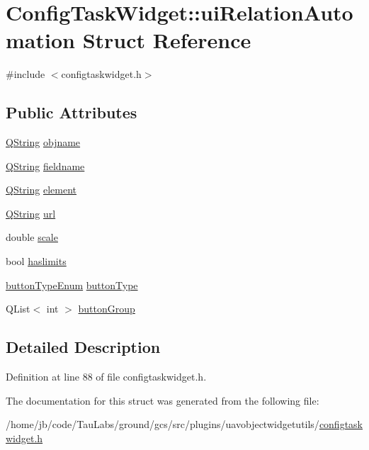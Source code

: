 \hypertarget{struct_config_task_widget_1_1ui_relation_automation}{\section{\-Config\-Task\-Widget\-:\-:ui\-Relation\-Automation \-Struct \-Reference}
\label{struct_config_task_widget_1_1ui_relation_automation}
}


{\ttfamily \#include $<$configtaskwidget.\-h$>$}

\subsection*{\-Public \-Attributes}
\begin{DoxyCompactItemize}
\item 
\hyperlink{group___u_a_v_objects_plugin_gab9d252f49c333c94a72f97ce3105a32d}{\-Q\-String} \hyperlink{group___u_a_v_object_widget_utils_ga3a6899c9cfb56d74f0bf98300a156bc7}{objname}
\item 
\hyperlink{group___u_a_v_objects_plugin_gab9d252f49c333c94a72f97ce3105a32d}{\-Q\-String} \hyperlink{group___u_a_v_object_widget_utils_ga727a26d7cef842f8e7cd274117a1153d}{fieldname}
\item 
\hyperlink{group___u_a_v_objects_plugin_gab9d252f49c333c94a72f97ce3105a32d}{\-Q\-String} \hyperlink{group___u_a_v_object_widget_utils_gabe7df1fc4c590dc11cc6f80698fc125c}{element}
\item 
\hyperlink{group___u_a_v_objects_plugin_gab9d252f49c333c94a72f97ce3105a32d}{\-Q\-String} \hyperlink{group___u_a_v_object_widget_utils_ga14b83b3a1113a21d03ee1b3e8967b7e7}{url}
\item 
double \hyperlink{group___u_a_v_object_widget_utils_gafddb00770c074c3ce12d1699813a4d30}{scale}
\item 
bool \hyperlink{group___u_a_v_object_widget_utils_ga73f9beb614502506b14c6b5d235b9d44}{haslimits}
\item 
\hyperlink{group___u_a_v_object_widget_utils_gacf8aa6ed9da799d1973519df03d1ecfa}{button\-Type\-Enum} \hyperlink{group___u_a_v_object_widget_utils_gac8fcf738efe2855fbf1c7a810a20cffd}{button\-Type}
\item 
\-Q\-List$<$ int $>$ \hyperlink{group___u_a_v_object_widget_utils_ga915cb6bdf9aff1b607f8917b6f665fbd}{button\-Group}
\end{DoxyCompactItemize}


\subsection{\-Detailed \-Description}


\-Definition at line 88 of file configtaskwidget.\-h.



\-The documentation for this struct was generated from the following file\-:\begin{DoxyCompactItemize}
\item 
/home/jb/code/\-Tau\-Labs/ground/gcs/src/plugins/uavobjectwidgetutils/\hyperlink{configtaskwidget_8h}{configtaskwidget.\-h}\end{DoxyCompactItemize}

